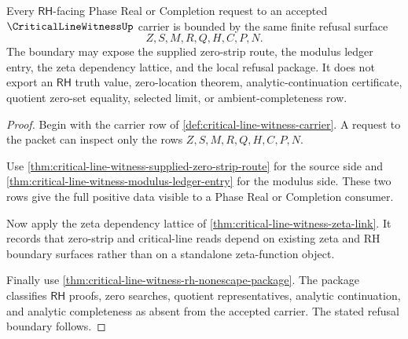 \begin{theorem}
\label{thm:critical-line-witness-rh-refusal-phase-boundary}
Every $\mathsf{RH}$-facing Phase Real or Completion request to an accepted $\CriticalLineWitnessUp$ carrier is bounded by the same finite refusal surface
$$
Z,S,M,R,Q,H,C,P,N.
$$
The boundary may expose the supplied zero-strip route, the modulus ledger entry, the zeta dependency lattice, and the local refusal package. It does not export an $\mathsf{RH}$ truth value, zero-location theorem, analytic-continuation certificate, quotient zero-set equality, selected limit, or ambient-completeness row.
\end{theorem}
\begin{proof}
Begin with the carrier row of \autoref{def:critical-line-witness-carrier}. A request to the packet can inspect only the rows $Z,S,M,R,Q,H,C,P,N$.

Use \autoref{thm:critical-line-witness-supplied-zero-strip-route} for the source side and \autoref{thm:critical-line-witness-modulus-ledger-entry} for the modulus side. These two rows give the full positive data visible to a Phase Real or Completion consumer.

Now apply the zeta dependency lattice of \autoref{thm:critical-line-witness-zeta-link}. It records that zero-strip and critical-line reads depend on existing zeta and RH boundary surfaces rather than on a standalone zeta-function object.

Finally use \autoref{thm:critical-line-witness-rh-nonescape-package}. The package classifies $\mathsf{RH}$ proofs, zero searches, quotient representatives, analytic continuation, and analytic completeness as absent from the accepted carrier. The stated refusal boundary follows.
\end{proof}
